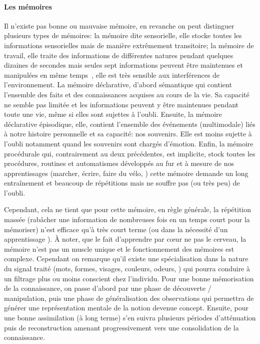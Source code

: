             \paragraph{Les mémoires}
                Il n'existe pas  bonne ou  mauvaise mémoire, en revanche on peut distinguer plusieurs types de mémoires: la mémoire dite sensorielle, elle stocke toutes les informations sensorielles mais de manière extrêmement transitoire; la mémoire de travail, elle traite des informations de différentes natures pendant quelques dizaines de secondes mais seules sept informations peuvent être maintenues et manipulées en même temps~, elle est très sensible aux interférences de l’environnement. La mémoire déclarative, d'abord sémantique qui contient l’ensemble des faits et des connaissances acquises au cours de la vie. Sa capacité ne semble pas limitée et les informations peuvent y être maintenues pendant toute une vie, même si elles sont sujettes à l’oubli. Ensuite, la mémoire déclarative épisodique, elle, contient l’ensemble des événements (multimodale) liés à notre histoire personnelle et sa capacité: nos souvenirs. Elle est moins sujette à l’oubli notamment quand les souvenirs sont chargés d’émotion. Enfin, la mémoire procédurale qui, contrairement au deux précédentes, est implicite, stock toutes les procédures, routines et automatismes développés au fur et à mesure de nos apprentissages (\eg marcher, écrire, faire du vélo, \etc) cette mémoire demande un long entraînement et beaucoup de répétitions mais ne souffre pas (ou très peu) de l'oubli.\par%
                Cependant, cela ne tient que pour cette mémoire, en règle générale, la répétition massée (rabâcher une information de nombreuses fois en un temps court pour la mémoriser) n’est efficace qu’à très court terme (ou dans la nécessité d'un apprentissage ). À noter, que le fait d'apprendre par cœur ne  pas le cerveau, la mémoire n’est pas un muscle unique et le fonctionnement des mémoires est complexe. Cependant on remarque qu'il existe une spécialisation dans la nature du signal traité (mots, formes, visages, couleurs, odeurs, \etc) qui pourra conduire à un filtrage plus ou moins conscient chez l'individu.
                Pour une bonne mémorisation de la connaissance, on passe d'abord par une phase de découverte / manipulation, puis une phase de généralisation des observations qui permettra de générer une représentation mentale de la notion devenue concept. Ensuite, pour une bonne assimilation (à long terme) s'en suivra plusieurs périodes d'atténuation puis de reconstruction amenant progressivement vers une consolidation de la connaissance.\par%
